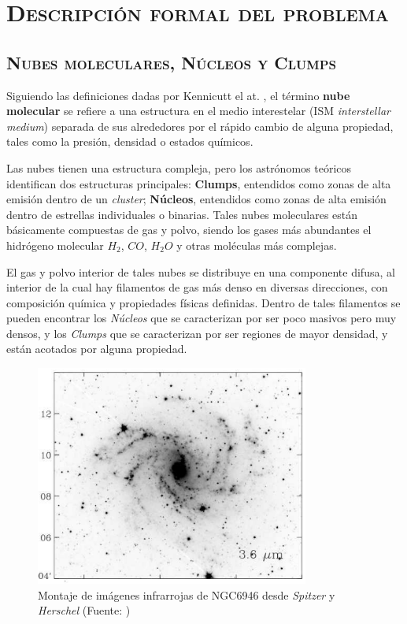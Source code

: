 \documentclass[letter, 11pt]{article}
\begin{document}
\section{\textsc{Descripción formal del problema}}

\subsection{\textsc{Nubes moleculares, Núcleos y Clumps}}
Siguiendo las definiciones dadas por Kennicutt el at. \cite{Kennicutt}, el término \textbf{nube molecular} se refiere a una estructura en el medio interestelar (ISM \textit{interstellar medium}) separada de sus alrededores por el rápido cambio de alguna propiedad, tales como la presión, densidad o estados químicos.

Las nubes tienen una estructura compleja, pero los astrónomos teóricos identifican dos estructuras principales: \textbf{Clumps}, entendidos como zonas de alta emisión dentro de un \textit{cluster}; \textbf{Núcleos}, entendidos como zonas de alta emisión dentro de estrellas individuales o binarias. Tales nubes moleculares están básicamente compuestas de gas y polvo, siendo los gases más abundantes el hidrógeno molecular $H_2$, $CO$, $H_2O$ y otras moléculas más complejas.

El gas y polvo interior de tales nubes se distribuye en una componente difusa, al interior de la cual hay filamentos de gas más denso en diversas direcciones, con composición química y propiedades físicas definidas. Dentro de tales filamentos se pueden encontrar los \textit{Núcleos} que se caracterizan por ser poco masivos pero muy densos, y los \textit{Clumps} que se caracterizan por ser regiones de mayor densidad, y están acotados por alguna propiedad.

\begin{figure}[htpb!]
\centering
\includegraphics[width=9cm]{ngc}
\caption{Montaje de imágenes infrarrojas de NGC6946 desde \textit{Spitzer} y \textit{Herschel} (Fuente: \cite{Williams})}
\label{fig:cf}
\end{figure}
\end{document}
